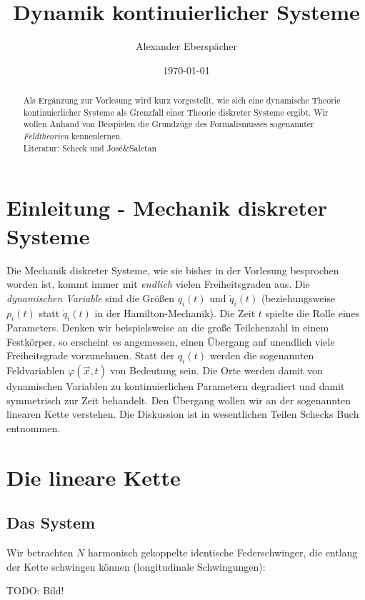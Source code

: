 \documentclass[paper=a4, fontsize=11.0pt, abstractoff, DIV12]{scrartcl}
\title{Dynamik kontinuierlicher Systeme}
\author{Alexander Eberspächer}
\date{\today}
\begin{document}
\maketitle
\begin{abstract}
Als Ergänzung zur Vorlesung wird kurz vorgestellt, wie sich eine dynamische
Theorie kontinuierlicher Systeme als Grenzfall einer Theorie diskreter
Systeme ergibt. Wir wollen Anhand von Beispielen die Grundzüge des
Formalismusses sogenannter \emph{Feldtheorien} kennenlernen.\\[0.5ex]
Literatur: Scheck \cite{Scheck} und José\&Saletan \cite{JoseSaletan}
\end{abstract}

\section{Einleitung - Mechanik diskreter Systeme}

Die Mechanik diskreter Systeme, wie sie bisher in der Vorlesung besprochen
worden ist, kommt immer mit \emph{endlich} vielen Freiheitsgraden aus. Die
\emph{dynamischen Variable} sind die Größen $q_i(t)$ und $\dot{q}_i(t)$
(beziehungsweise $p_i(t)$ statt $\dot{q}_i(t)$ in der Hamilton-Mechanik).
Die Zeit $t$ spielte die Rolle eines Parameters. Denken wir beispielsweise
an die große Teilchenzahl in einem Festkörper, so erscheint es angemessen,
einen Übergang auf unendlich viele Freiheitsgrade vorzunehmen. Statt der
$q_i(t)$ werden die sogenannten Feldvariablen $\varphi(\vec x, t)$ von
Bedeutung sein. Die Orte werden damit von dynamischen Variablen zu
kontinuierlichen Parametern degradiert und damit symmetrisch zur Zeit
behandelt. Den Übergang wollen wir an der sogenannten linearen Kette
verstehen. Die Diskussion ist in wesentlichen Teilen Schecks Buch
\cite{Scheck} entnommen.

\section{Die lineare Kette}

\subsection{Das System}

Wir betrachten $N$ harmonisch gekoppelte identische Federschwinger, die
entlang der Kette schwingen können (longitudinale Schwingungen):

TODO: Bild!
\end{document}
